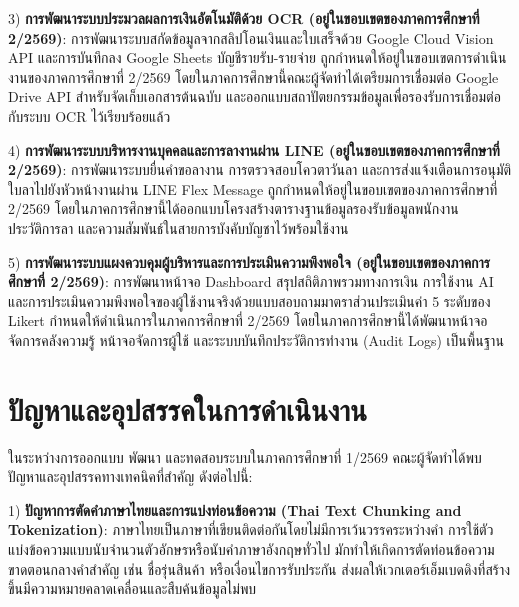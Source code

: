 \begin{mycustomitem}
\item 3) \textbf{การพัฒนาระบบประมวลผลการเงินอัตโนมัติด้วย OCR (อยู่ในขอบเขตของภาคการศึกษาที่ 2/2569)}: การพัฒนาระบบสกัดข้อมูลจากสลิปโอนเงินและใบเสร็จด้วย Google Cloud Vision API และการบันทึกลง Google Sheets บัญชีรายรับ-รายจ่าย ถูกกำหนดให้อยู่ในขอบเขตการดำเนินงานของภาคการศึกษาที่ 2/2569 โดยในภาคการศึกษานี้คณะผู้จัดทำได้เตรียมการเชื่อมต่อ Google Drive API สำหรับจัดเก็บเอกสารต้นฉบับ และออกแบบสถาปัตยกรรมข้อมูลเพื่อรองรับการเชื่อมต่อกับระบบ OCR ไว้เรียบร้อยแล้ว
\end{mycustomitem}

\begin{mycustomitem}
\item 4) \textbf{การพัฒนาระบบบริหารงานบุคคลและการลางานผ่าน LINE (อยู่ในขอบเขตของภาคการศึกษาที่ 2/2569)}: การพัฒนาระบบยื่นคำขอลางาน การตรวจสอบโควตาวันลา และการส่งแจ้งเตือนการอนุมัติใบลาไปยังหัวหน้างานผ่าน LINE Flex Message ถูกกำหนดให้อยู่ในขอบเขตของภาคการศึกษาที่ 2/2569 โดยในภาคการศึกษานี้ได้ออกแบบโครงสร้างตารางฐานข้อมูลรองรับข้อมูลพนักงาน ประวัติการลา และความสัมพันธ์ในสายการบังคับบัญชาไว้พร้อมใช้งาน
\end{mycustomitem}

\begin{mycustomitem}
\item 5) \textbf{การพัฒนาระบบแผงควบคุมผู้บริหารและการประเมินความพึงพอใจ (อยู่ในขอบเขตของภาคการศึกษาที่ 2/2569)}: การพัฒนาหน้าจอ Dashboard สรุปสถิติภาพรวมทางการเงิน การใช้งาน AI และการประเมินความพึงพอใจของผู้ใช้งานจริงด้วยแบบสอบถามมาตราส่วนประเมินค่า 5 ระดับของ Likert กำหนดให้ดำเนินการในภาคการศึกษาที่ 2/2569 โดยในภาคการศึกษานี้ได้พัฒนาหน้าจอจัดการคลังความรู้ หน้าจอจัดการผู้ใช้ และระบบบันทึกประวัติการทำงาน (Audit Logs) เป็นพื้นฐาน
\end{mycustomitem}

\section{ปัญหาและอุปสรรคในการดำเนินงาน}
\hspace*{1.3em}
ในระหว่างการออกแบบ พัฒนา และทดสอบระบบในภาคการศึกษาที่ 1/2569 คณะผู้จัดทำได้พบปัญหาและอุปสรรคทางเทคนิคที่สำคัญ ดังต่อไปนี้:

\begin{mycustomitem}
\item 1) \textbf{ปัญหาการตัดคำภาษาไทยและการแบ่งท่อนข้อความ (Thai Text Chunking and Tokenization)}: ภาษาไทยเป็นภาษาที่เขียนติดต่อกันโดยไม่มีการเว้นวรรคระหว่างคำ การใช้ตัวแบ่งข้อความแบบนับจำนวนตัวอักษรหรือนับคำภาษาอังกฤษทั่วไป มักทำให้เกิดการตัดท่อนข้อความขาดตอนกลางคำสำคัญ เช่น ชื่อรุ่นสินค้า หรือเงื่อนไขการรับประกัน ส่งผลให้เวกเตอร์เอ็มเบดดิงที่สร้างขึ้นมีความหมายคลาดเคลื่อนและสืบค้นข้อมูลไม่พบ
\end{mycustomitem}

